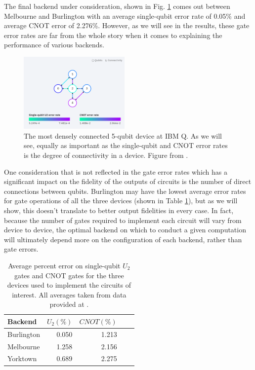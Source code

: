 The final backend under consideration, shown in Fig.
\ref{fig:yorktown_connections} comes out between Melbourne and Burlington with
an average single-qubit error rate of 0.05\% and average CNOT error of 2.276\%.
However, as we will see in the results, these gate error rates are far from the
whole story when it comes to explaining the performance of various backends.

\begin{figure}[h] \centering
\includegraphics[width=0.48\textwidth]{images/connection_diagram_ibmqx2.png}
  \caption{The most densely connected 5-qubit device at IBM Q. As we will see,
equally as important as the single-qubit and CNOT error rates is the degree of
connectivity in a device. Figure from \cite{ibmq_yorktown}.}
  \label{fig:yorktown_connections}
\end{figure}

One consideration that is not reflected in the gate error rates which has a
significant impact on the fidelity of the outputs of circuits is the number of
direct connections between qubits. Burlington may have the lowest average error
rates for gate operations of all the three devices (shown in Table
\ref{tb:average_errors}), but as we will show, this doesn't translate to better
output fidelities in every case. In fact, because the number of gates required
to implement each circuit will vary from device to device, the optimal backend
on which to conduct a given computation will ultimately depend more on the
configuration of each backend, rather than gate errors.

\begin{table} \centering
  \begin{tabular}{lrrrr} \toprule Backend & $U_2 (\%)$ & $CNOT (\%)$ \\ \midrule
Burlington & 0.050 & 1.213 \\ Melbourne & 1.258 & 2.156 \\ Yorktown & 0.689 &
2.275 \\ \bottomrule
  \end{tabular}
  \caption{Average percent error on single-qubit $U_2$ gates and CNOT gates for
the three devices used to implement the circuits of interest. All averages taken
from data provided at \cite{ibmq_burlington,ibmq_16_melbourne,ibmq_yorktown}.}
  \label{tb:average_errors}
\end{table}

